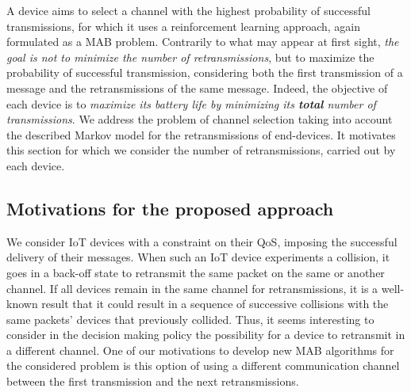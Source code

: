 A device aims to select a channel with the highest probability of successful transmissions, for which it uses a reinforcement learning approach, again formulated as a MAB problem.
Contrarily to what may appear at first sight,
\emph{the goal is not to minimize the number of retransmissions}, but to maximize the probability of successful transmission, considering both the first transmission of a message and the retransmissions of the same message.
Indeed, the objective of each device is to \emph{maximize its battery life by minimizing its \textbf{total} number of transmissions}.
%
We address the problem of channel selection taking into account the described Markov model for the retransmissions of end-devices.
It motivates this section for which we consider the number of retransmissions, carried out by each device.
%

\subsection{Motivations for the proposed approach}
\label{sub:43:motivations}

We consider IoT devices with a constraint on their QoS, imposing the successful delivery of their messages.
When such an IoT device experiments a collision, it goes in a back-off state to retransmit the same packet on the same or another channel.
If all devices remain in the same channel for retransmissions, it is a well-known result that it could result in a sequence of successive collisions with the same packets' devices that previously collided.
%
Thus, it seems interesting to consider in the decision making policy the possibility for a device to retransmit in a different channel.
One of our motivations to develop new MAB algorithms for the considered problem is this option of using a different communication channel between the first transmission and the next retransmissions.

